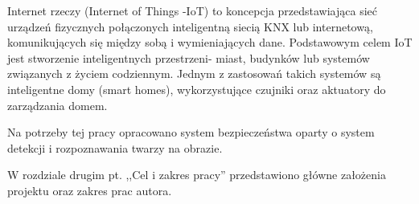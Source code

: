 Internet rzeczy (Internet of Things -IoT) to koncepcja przedstawiająca sieć urządzeń fizycznych połączonych inteligentną siecią KNX lub internetową, komunikujących się między sobą i wymieniających dane. Podstawowym celem IoT jest stworzenie inteligentnych przestrzeni- miast, budynków lub systemów związanych z życiem codziennym. Jednym z zastosowań takich systemów są inteligentne domy (smart homes), wykorzystujące czujniki oraz aktuatory do zarządzania domem.

Na potrzeby tej pracy opracowano system bezpieczeństwa oparty o system detekcji i rozpoznawania twarzy na obrazie.


W rozdziale drugim pt. ,,Cel i zakres pracy'' przedstawiono główne założenia projektu oraz zakres prac autora.

